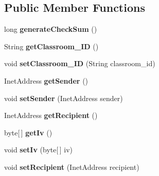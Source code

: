 \subsection*{\-Public \-Member \-Functions}
\begin{DoxyCompactItemize}
\item 
\hypertarget{classstorage_1_1_message_a2cbf5860a76bfcddf48b8b2c44dd4e8b}{
long {\bfseries generate\-Check\-Sum} ()}
\label{classstorage_1_1_message_a2cbf5860a76bfcddf48b8b2c44dd4e8b}

\item 
\hypertarget{classstorage_1_1_message_a7fd080bf590d2beeb8f2a68dd5c62efc}{
\-String {\bfseries get\-Classroom\-\_\-\-I\-D} ()}
\label{classstorage_1_1_message_a7fd080bf590d2beeb8f2a68dd5c62efc}

\item 
\hypertarget{classstorage_1_1_message_a9c4d0a212bf2b8b915971b93fbca62a4}{
void {\bfseries set\-Classroom\-\_\-\-I\-D} (\-String classroom\-\_\-id)}
\label{classstorage_1_1_message_a9c4d0a212bf2b8b915971b93fbca62a4}

\item 
\hypertarget{classstorage_1_1_message_a319e2500fbe56195462e1ff75b02aa3c}{
\-Inet\-Address {\bfseries get\-Sender} ()}
\label{classstorage_1_1_message_a319e2500fbe56195462e1ff75b02aa3c}

\item 
\hypertarget{classstorage_1_1_message_ad2101f3439d198f89bcf8f80a49389f2}{
void {\bfseries set\-Sender} (\-Inet\-Address sender)}
\label{classstorage_1_1_message_ad2101f3439d198f89bcf8f80a49389f2}

\item 
\hypertarget{classstorage_1_1_message_a2d625db185eb8e94fb6c40fdb4cc1678}{
\-Inet\-Address {\bfseries get\-Recipient} ()}
\label{classstorage_1_1_message_a2d625db185eb8e94fb6c40fdb4cc1678}

\item 
\hypertarget{classstorage_1_1_message_aed2e6e4db742827b787616f38596ca03}{
byte\mbox{[}$\,$\mbox{]} {\bfseries get\-Iv} ()}
\label{classstorage_1_1_message_aed2e6e4db742827b787616f38596ca03}

\item 
\hypertarget{classstorage_1_1_message_a311ee69954f47b02d41a450bd9e0a1d9}{
void {\bfseries set\-Iv} (byte\mbox{[}$\,$\mbox{]} iv)}
\label{classstorage_1_1_message_a311ee69954f47b02d41a450bd9e0a1d9}

\item 
\hypertarget{classstorage_1_1_message_abe67a21ab10f0596b98f9c1077cbe17c}{
void {\bfseries set\-Recipient} (\-Inet\-Address recipient)}
\label{classstorage_1_1_message_abe67a21ab10f0596b98f9c1077cbe17c}


\end{DoxyCompactItemize}
